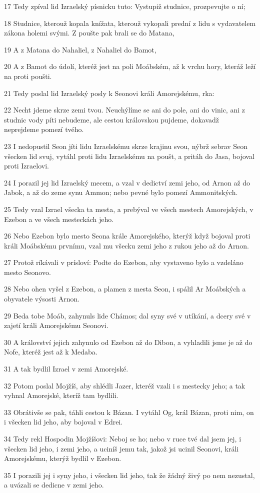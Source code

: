 \par 17 Tedy zpíval lid Izraelský písnicku tuto: Vystupiž studnice, prozpevujte o ní;
\par 18 Studnice, kterouž kopala knížata, kterouž vykopali prední z lidu s vydavatelem zákona holemi svými. Z poušte pak brali se do Matana,
\par 19 A z Matana do Nahaliel, z Nahaliel do Bamot,
\par 20 A z Bamot do údolí, kteréž jest na poli Moábském, až k vrchu hory, kteráž leží na proti poušti.
\par 21 Tedy poslal lid Izraelský posly k Seonovi králi Amorejskému, rka:
\par 22 Necht jdeme skrze zemi tvou. Neuchýlíme se ani do pole, ani do vinic, ani z studnic vody píti nebudeme, ale cestou královskou pujdeme, dokavadž neprejdeme pomezí tvého.
\par 23 I nedopustil Seon jíti lidu Izraelskému skrze krajinu svou, nýbrž sebrav Seon všecken lid svuj, vytáhl proti lidu Izraelskému na poušt, a pritáh do Jasa, bojoval proti Izraelovi.
\par 24 I porazil jej lid Izraelský mecem, a vzal v dedictví zemi jeho, od Arnon až do Jabok, a až do zeme synu Ammon; nebo pevné bylo pomezí Ammonitských.
\par 25 Tedy vzal Izrael všecka ta mesta, a prebýval ve všech mestech Amorejských, v Ezebon a ve všech mesteckách jeho.
\par 26 Nebo Ezebon bylo mesto Seona krále Amorejského, kterýž když bojoval proti králi Moábskému prvnímu, vzal mu všecku zemi jeho z rukou jeho až do Arnon.
\par 27 Protož ríkávali v prísloví: Podte do Ezebon, aby vystaveno bylo a vzdeláno mesto Seonovo.
\par 28 Nebo ohen vyšel z Ezebon, a plamen z mesta Seon, i spálil Ar Moábských a obyvatele výsosti Arnon.
\par 29 Beda tobe Moáb, zahynuls lide Chámos; dal syny své v utíkání, a dcery své v zajetí králi Amorejskému Seonovi.
\par 30 A království jejich zahynulo od Ezebon až do Dibon, a vyhladili jsme je až do Nofe, kteréž jest až k Medaba.
\par 31 A tak bydlil Izrael v zemi Amorejské.
\par 32 Potom poslal Mojžíš, aby shlédli Jazer, kteréž vzali i s mestecky jeho; a tak vyhnal Amorejské, kteríž tam bydlili.
\par 33 Obrátivše se pak, táhli cestou k Bázan. I vytáhl Og, král Bázan, proti nim, on i všecken lid jeho, aby bojoval v Edrei.
\par 34 Tedy rekl Hospodin Mojžíšovi: Neboj se ho; nebo v ruce tvé dal jsem jej, i všecken lid jeho, i zemi jeho, a uciníš jemu tak, jakož jsi ucinil Seonovi, králi Amorejskému, kterýž bydlil v Ezebon.
\par 35 I porazili jej i syny jeho, i všecken lid jeho, tak že žádný živý po nem nezustal, a uvázali se dedicne v zemi jeho.

